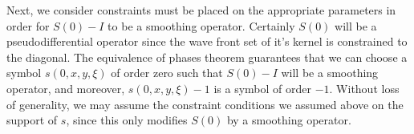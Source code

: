 \begin{comment}
    We have
    \[ \frac{\partial^N K_t(x,y)}{\partial t^N} = (2 \pi i)^N \int (\phi_1(x,y,\xi) - \phi_0(x,y,\xi))^N a(x,y,\xi) e^{2 \pi i \phi_t(x,y,\xi)}\; d\xi. \]
    Now $(\phi_1 - \phi_0)^N \cdot a$ is a symbol of order $r + N$. But on the other hand, using the fact that $(\phi_1 - \phi_0)^N \lesssim |x - y|^{2N} |\xi|^N$, and thus vanishes to order $2N$ on the diagonal, then combined with the fact that $|\nabla_\xi \phi(x,y,\xi)| \gtrsim |x - y|$, we actually see via an integration by parts $2N$ times in $\xi$ that we can rewrite the integral in terms of a symbol of order $r - N$ and the same phase $\phi_t$. Applying Taylor's theorem, we write
    \[ K(x,y) = K_1(x,y) = \sum_{k = 0}^{N-1} \frac{1}{k!} \left. \frac{\partial^k K_t(x,y)}{\partial t^k} \right|_{t = 1} + \frac{1}{N!} \int_0^1 t^{N-1} \frac{d^NK_t(x,y)}{dt^N}\; dt. \]
    This integral gives an arbitrarily smooth kernel as $N \to \infty$. Thus if we let $T$ be a pseudodifferential operator of order $r$ such that
    \[ T \sim \sum_{k = 0}^\infty \frac{1}{k!} \left. \frac{\partial^k K_t(x,y)}{\partial t^k} \right|_{t = 1}, \]
    then $T - S$ is a smoothing operator. Now if $\tilde{T}$ is the pseudodifferential operator corresponding to the symbol $a(x,x,\xi)$, then $T - \tilde{T}$, and thus $S - \tilde{T}$, is a pseudodifferential operator of order $r-1$. The converse is similar, working in the opposite direction, i.e. from $t = 1$ to $t = 0$, and is left as an exercise.
\end{proof}
\end{comment}

%
%

Next, we consider constraints must be placed on the appropriate parameters in order for $S(0) - I$ to be a smoothing operator. Certainly $S(0)$ will be a pseudodifferential operator since the wave front set of it's kernel is constrained to the diagonal. The equivalence of phases theorem guarantees that we can choose a symbol $s(0,x,y,\xi)$ of order zero such that $S(0) - I$ will be a smoothing operator, and moreover, $s(0,x,y,\xi) - 1$ is a symbol of order $-1$. Without loss of generality, we may assume the constraint conditions we assumed above on the support of $s$, since this only modifies $S(0)$ by a smoothing operator.

